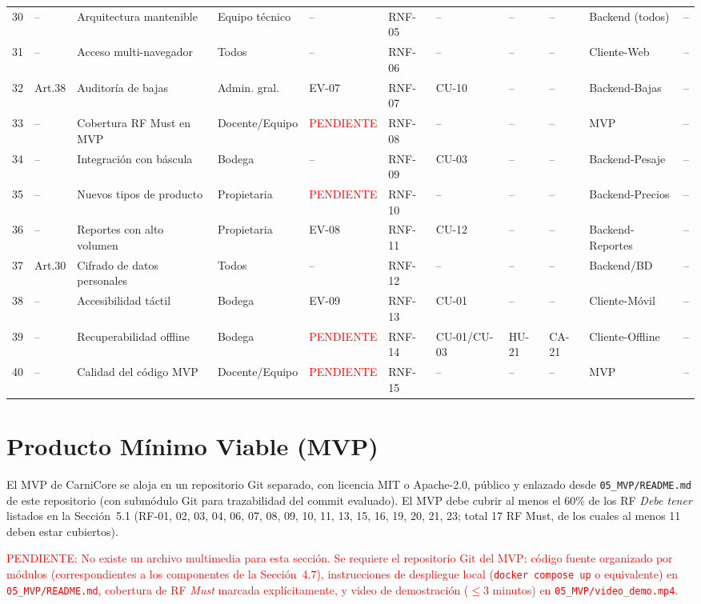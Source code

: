 \documentclass[11pt,a4paper]{article}
\begin{document}
\begin{longtable}{|p{0.6cm}|p{1.6cm}|p{2.3cm}|p{1.7cm}|p{0.9cm}|p{0.9cm}|p{0.9cm}|p{0.9cm}|p{0.9cm}|p{1.5cm}|p{1.1cm}|}
30 & -- & Arquitectura mantenible & Equipo técnico & -- & RNF-05 & -- & -- & -- & Backend (todos) & -- \\
31 & -- & Acceso multi-navegador & Todos & -- & RNF-06 & -- & -- & -- & Cliente-Web & -- \\
32 & Art.38 & Auditoría de bajas & Admin. gral. & EV-07 & RNF-07 & CU-10 & -- & -- & Backend-Bajas & -- \\
33 & -- & Cobertura RF Must en MVP & Docente/Equipo & \textcolor{red}{PENDIENTE} & RNF-08 & -- & -- & -- & MVP & -- \\
34 & -- & Integración con báscula & Bodega & -- & RNF-09 & CU-03 & -- & -- & Backend-Pesaje & -- \\
35 & -- & Nuevos tipos de producto & Propietaria & \textcolor{red}{PENDIENTE} & RNF-10 & -- & -- & -- & Backend-Precios & -- \\
36 & -- & Reportes con alto volumen & Propietaria & EV-08 & RNF-11 & CU-12 & -- & -- & Backend-Reportes & -- \\
37 & Art.30 & Cifrado de datos personales & Todos & -- & RNF-12 & -- & -- & -- & Backend/BD & -- \\
38 & -- & Accesibilidad táctil & Bodega & EV-09 & RNF-13 & CU-01 & -- & -- & Cliente-Móvil & -- \\
39 & -- & Recuperabilidad offline & Bodega & \textcolor{red}{PENDIENTE} & RNF-14 & CU-01/CU-03 & HU-21 & CA-21 & Cliente-Offline & -- \\
40 & -- & Calidad del código MVP & Docente/Equipo & \textcolor{red}{PENDIENTE} & RNF-15 & -- & -- & -- & MVP & -- \\
\hline
\end{longtable}
\normalsize

\section{Producto Mínimo Viable (MVP)}
El MVP de CarniCore se aloja en un repositorio Git separado, con licencia MIT o Apache-2.0, público y enlazado desde \texttt{05\_MVP/README.md} de este repositorio (con submódulo Git para trazabilidad del commit evaluado). El MVP debe cubrir al menos el 60\% de los RF \textit{Debe tener} listados en la Sección~5.1 (RF-01, 02, 03, 04, 06, 07, 08, 09, 10, 11, 13, 15, 16, 19, 20, 21, 23; total 17 RF Must, de los cuales al menos 11 deben estar cubiertos).

\textcolor{red}{PENDIENTE: No existe un archivo multimedia para esta sección. Se requiere el repositorio Git del MVP: código fuente organizado por módulos (correspondientes a los componentes de la Sección~4.7), instrucciones de despliegue local (\texttt{docker compose up} o equivalente) en \texttt{05\_MVP/README.md}, cobertura de RF \textit{Must} marcada explícitamente, y video de demostración ($\leq$3 minutos) en \texttt{05\_MVP/video\_demo.mp4}.}
\end{document}
